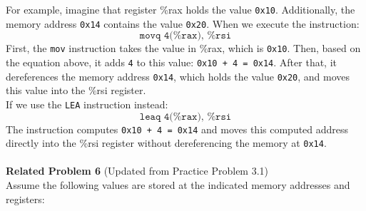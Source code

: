 For example, imagine that register \%rax holds the value \texttt{0x10}. Additionally, 
the memory address \texttt{0x14} contains the value \texttt{0x20}. When we execute the 
instruction:
%
\[
\texttt{movq 4(\%rax), \%rsi}
\]
%
First, the \texttt{mov} instruction takes the value in \%rax, which is \texttt{0x10}. 
Then, based on the equation above, it adds \texttt{4} to this value: \texttt{0x10 + 4 = 0x14}. 
After that, it dereferences the memory address \texttt{0x14}, which holds the value \texttt{0x20}, and moves this value into the \%rsi register. \\
%
If we use the \texttt{LEA} instruction instead:
%
\[
\texttt{leaq 4(\%rax), \%rsi}
\]
%
The instruction computes \texttt{0x10 + 4 = 0x14} and moves this computed address 
directly into the \%rsi register without dereferencing the memory at \texttt{0x14}. \\ 
\\
%
\noindent\textbf{Related Problem 6} (Updated from Practice Problem 3.1) \\
Assume the following values are stored at the indicated memory addresses and registers:

